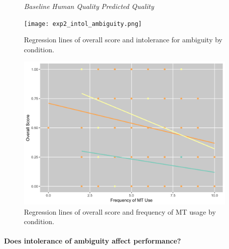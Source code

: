 \begin{figure}[h!]
  \centering
  
     \textit{Baseline} \quad
     \textit{Human Quality} \quad
     \textit{Predicted Quality} \quad
    
  \begin{minipage}[b]{0.45\textwidth}
    
    \texttt{[image: exp2\_intol\_ambiguity.png]}
    \caption{Regression lines of overall score and intolerance for ambiguity by condition.}
    \label{fig:exp_intol_ambiguity}
    
  \end{minipage}
  \hfill
  \begin{minipage}[b]{0.45\textwidth}
  
    \includegraphics[width=0.95\textwidth]{images/exp2_MT_useage.png}
    \caption{Regression lines of overall score and frequency of MT usage by condition.}
    \label{fig:exp_MT_use}
    
  \end{minipage}
\end{figure}

\paragraph{\textbf{Does intolerance of ambiguity affect performance?}} 

